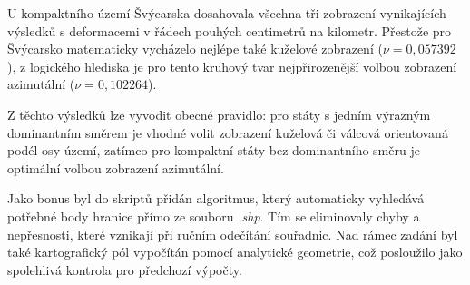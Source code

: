 \documentclass[12pt, a4paper]{article}
\begin{document}
U kompaktního území Švýcarska dosahovala všechna tři zobrazení vynikajících výsledků s deformacemi v řádech pouhých centimetrů na kilometr. Přestože pro Švýcarsko matematicky vycházelo nejlépe také kuželové zobrazení ($\nu = 0,057392$), z logického hlediska je pro tento kruhový tvar nejpřirozenější volbou zobrazení azimutální ($\nu = 0,102264$). 

Z těchto výsledků lze vyvodit obecné pravidlo: pro státy s jedním výrazným dominantním směrem je vhodné volit zobrazení kuželová či válcová orientovaná podél osy území, zatímco pro kompaktní státy bez dominantního směru je optimální volbou zobrazení azimutální.

Jako bonus byl do skriptů přidán algoritmus, který automaticky vyhledává potřebné body hranice přímo ze souboru \textit{.shp}. Tím se eliminovaly chyby a nepřesnosti, které vznikají při ručním odečítání souřadnic. Nad rámec zadání byl také kartografický pól vypočítán pomocí analytické geometrie, což posloužilo jako spolehlivá kontrola pro předchozí výpočty.

\printbibliography[title=Zdroje]
\end{document}

